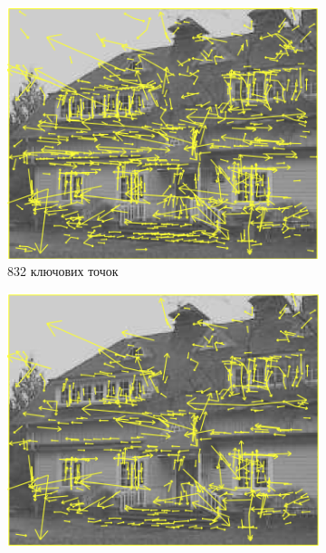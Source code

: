\begin{enumerate}
        \begin{figure}[H]
            \centering
            \ContinuedFloat
            \begin{subfigure}[c]{0.3\textwidth}
                \centering
                \includegraphics[width=\textwidth]{images/sift4}
                \caption{ 832 ключових точок
                \label{fig:swift4}
                }
            \end{subfigure}
            \begin{subfigure}[c]{0.3\textwidth}
                \centering
                \includegraphics[width=\textwidth]{images/sift5}

\end{subfigure}
\end{figure}
\end{enumerate}
